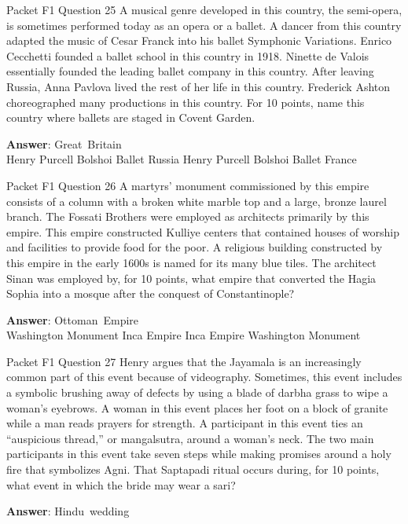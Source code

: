 \begin{frame}{Packet F1 Question 25}
A musical genre developed in this country, the semi-opera, is sometimes performed today as an opera or   a ballet. A dancer from this country adapted the music of Cesar Franck into his ballet Symphonic Variations. Enrico Cecchetti founded a ballet school in this country in 1918. Ninette de Valois essentially founded the leading ballet company in this country. After   leaving Russia, Anna Pavlova lived the rest of her life in this country. Frederick Ashton choreographed many productions in this country. For 10 points, name this country where ballets are staged in Covent Garden.        

\textbf{Answer}: Great\ Britain\\
 Henry Purcell
 Bolshoi Ballet
 Russia
 Henry Purcell
 Bolshoi Ballet
 France
\end{frame}

\begin{frame}{Packet F1 Question 26}
A martyrs’ monument commissioned   by this empire consists of a   column with a broken white marble top and a large, bronze laurel branch. The Fossati Brothers were employed as architects primarily by this   empire. This empire constructed Kulliye   centers that contained houses of worship and facilities to provide food for the poor. A religious building constructed by this empire in the early 1600s is named for its many blue tiles. The architect Sinan was employed by, for 10 points, what empire that converted the Hagia Sophia into a mosque after the conquest of Constantinople?    

\textbf{Answer}: Ottoman\ Empire\\
 Washington Monument
 Inca Empire
 Inca Empire
 Washington Monument
\end{frame}

\begin{frame}{Packet F1 Question 27}
Henry argues that the Jayamala is an increasingly common part of this event because of videography. Sometimes, this event includes a symbolic brushing away of defects by using a blade of darbha grass to wipe a woman’s eyebrows. A woman in this event places her foot on a block of granite while a man reads prayers for strength. A participant in this event ties an “auspicious thread,” or mangalsutra, around a woman’s neck. The two main participants in this event take seven steps while making promises around a holy fire that symbolizes Agni.     That Saptapadi ritual     occurs during, for 10 points, what event in which the bride may wear a sari?

\textbf{Answer}: Hindu\ wedding\\
\end{frame}

